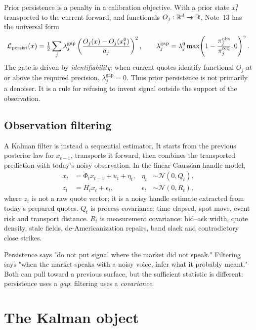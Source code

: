 \documentclass[11pt]{article}
\newcommand{\obs}{\mathrm{obs}}
\newcommand{\gap}{\mathrm{gap}}
\newcommand{\calL}{\mathcal L}
\begin{document}
Prior persistence is a penalty in a calibration objective. With a prior state
$x_t^0$ transported to the current forward, and functionals
$O_j:\mathbb{R}^d\to\mathbb{R}$, Note~13 has the universal form
\begin{equation}
\calL_{\mathrm{persist}}(x)
=\half\sum_j
\lambda_j^{\gap}
\left(\frac{O_j(x)-O_j(x_t^0)}{a_j}\right)^2,
\qquad
\lambda_j^{\gap}
=\lambda_j^0
\max\!\left(1-\frac{\pi^{\obs}_j}{\pi^{\mathrm{req}}_j},0\right)^\gamma .
\label{eq:persistence}
\end{equation}
The gate is driven by \emph{identifiability}: when current quotes identify
functional $O_j$ at or above the required precision, $\lambda_j^{\gap}=0$.
Thus prior persistence is not primarily a denoiser. It is a rule for refusing
to invent signal outside the support of the observation.

\subsection{Observation filtering}

A Kalman filter is instead a sequential estimator. It starts from the previous
posterior law for $x_{t-1}$, transports it forward, then combines the transported
prediction with today's noisy observation. In the linear-Gaussian handle model,
\begin{align}
x_t &= \Phi_t x_{t-1}+u_t+\eta_t,
&\eta_t&\sim\mathcal N(0,Q_t), \label{eq:state}\\
z_t &= H_t x_t+\epsilon_t,
&\epsilon_t&\sim\mathcal N(0,R_t), \label{eq:measurement}
\end{align}
where $z_t$ is not a raw quote vector; it is a noisy handle estimate extracted
from today's prepared quotes. $Q_t$ is process covariance: time elapsed, spot
move, event risk and transport distance. $R_t$ is measurement covariance:
bid--ask width, quote density, stale fields, de-Americanization repairs, band
slack and contradictory close strikes.

\begin{heuristic}
Persistence says "do not put signal where the market did not speak." Filtering
says "when the market speaks with a noisy voice, infer what it probably meant."
Both can pull toward a previous surface, but the sufficient statistic is
different: persistence uses a \emph{gap}; filtering uses a \emph{covariance}.
\end{heuristic}

\section{The Kalman object}
\label{sec:kalman}
\end{document}
